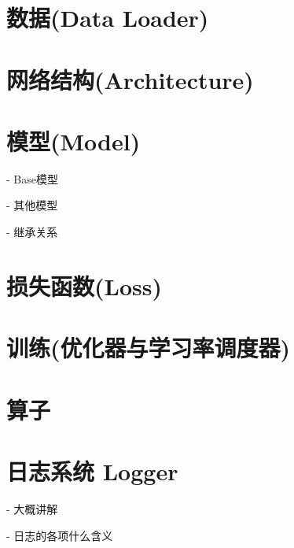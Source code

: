 \documentclass[../main.tex]{subfiles}
\begin{document}
\section{数据(Data Loader)}

\section{网络结构(Architecture)}

\section{模型(Model)}

- Base模型

- 其他模型

- 继承关系

\section{损失函数(Loss)}

\section{训练(优化器与学习率调度器)}

\section{算子}

\section{日志系统 Logger}

- 大概讲解

- 日志的各项什么含义
\end{document}
